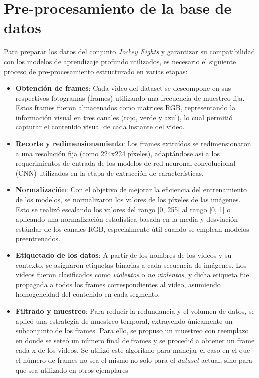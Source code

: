 \section{Pre-procesamiento de la base de datos}

Para preparar los datos del conjunto \textit{Jockey Fights} y 
garantizar su compatibilidad con los modelos de aprendizaje 
profundo utilizados, es necesario el siguiente proceso de 
pre-procesamiento estructurado en varias etapas:

\begin{itemize}
    \item \textbf{Obtención de frames}: Cada video del dataset 
    se descompone en sus respectivos fotogramas (frames) 
    utilizando una frecuencia de muestreo fija. Estos frames 
    fueron almacenados como matrices RGB, representando la 
    información visual en tres canales (rojo, verde y azul), 
    lo cual permitió capturar el contenido visual de cada 
    instante del video.

    \item \textbf{Recorte y redimensionamiento}: Los frames 
    extraídos se redimensionaron a una resolución fija 
    (como 224x224 píxeles), adaptándose así a los 
    requerimientos de entrada de los modelos de red neuronal 
    convolucional (CNN) utilizados en la etapa de extracción 
    de características.

    \item \textbf{Normalización}: Con el objetivo de mejorar 
    la eficiencia del entrenamiento de los modelos, se 
    normalizaron los valores de los píxeles de las imágenes. 
    Esto se realizó escalando los valores del rango [0, 255] 
    al rango [0, 1] o aplicando una normalización estadística 
    basada en la media y desviación estándar de los canales 
    RGB, especialmente útil cuando se emplean modelos 
    preentrenados.

    \item \textbf{Etiquetado de los datos}: A partir de los 
    nombres de los videos y su contexto, se asignaron etiquetas 
    binarias a cada secuencia de imágenes. Los videos fueron 
    clasificados como \textit{violentos} o 
    \textit{no violentos}, y dicha etiqueta fue propagada a 
    todos los frames correspondientes al video, asumiendo 
    homogeneidad del contenido en cada segmento.

    \item \textbf{Filtrado y muestreo}: Para reducir la 
    redundancia y el volumen de datos, se aplicó una 
    estrategia de muestreo temporal, extrayendo únicamente un 
    subconjunto de los frames. Para ello, se propuso un muestreo 
    con reemplazo en donde se seteó un número final de frames 
    y se 
    procedió a obtener un frame cada x de los videos. Se 
    utilizó este algoritmo para manejar el caso en el que el 
    número de frames no sea el mismo no solo para el 
    \textit{dataset} actual, sino para que sea utilizado en 
    otros ejemplares.

\end{itemize}

